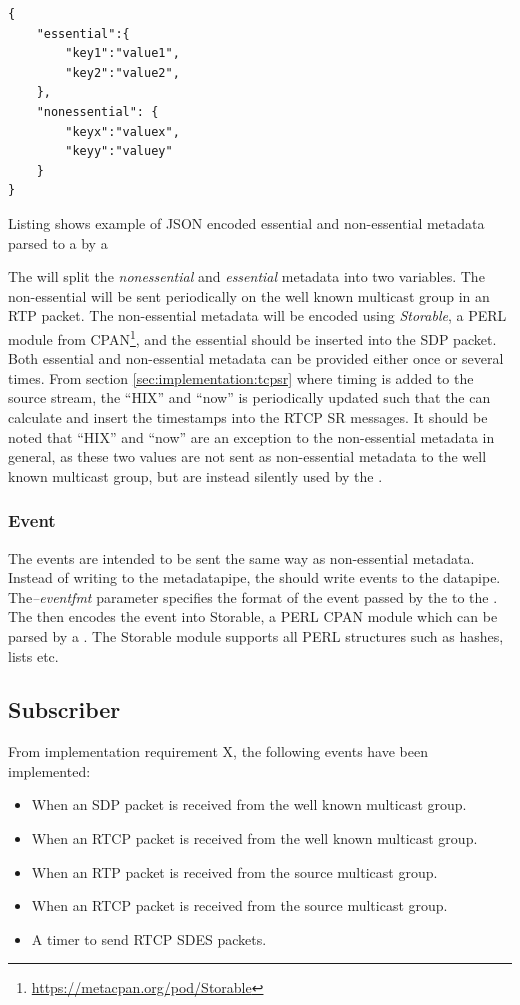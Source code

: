 \begin{listing}[H] 
\begin{verbatim}
{
	"essential":{
		"key1":"value1",
		"key2":"value2",
	},
	"nonessential": {
		"keyx":"valuex",
		"keyy":"valuey"
	}
}
\end{verbatim}
\caption{Listing shows example of JSON encoded essential and non-essential metadata parsed to a \pub{} by a \con{}}
\label{lst:implementation:nonessess}
\end{listing}

The \pub{} will split the \textit{nonessential} and \textit{essential} metadata into two variables. The non-essential will be sent periodically on the well known multicast group in an RTP packet.
The non-essential metadata will be encoded using \textit{Storable}, a PERL module from CPAN\footnote{\url{https://metacpan.org/pod/Storable}}, and the essential should be inserted into the SDP packet.
Both essential and non-essential metadata can be provided either once or several times.  From section \ref{sec:implementation:tcpsr} where timing is added to the source stream, the ``HIX'' and ``now'' is periodically updated such that the \pub{} can calculate and insert the timestamps into the RTCP SR messages.
It should be noted that ``HIX'' and ``now'' are an exception to the non-essential metadata in general, as these two values are not sent as non-essential metadata to the well known multicast group, but are instead silently used by the \pub{}.

\subsubsection{Event} \label{sec:implementation:events:pub}
The events are intended to be sent the same way as non-essential metadata. Instead of writing to the metadatapipe, the \pro{} should write events to the datapipe. The\textit{--eventfmt} parameter specifies the format of the event passed by the \pro{} to the \pub{}. The \pub{} then encodes the event into Storable, a PERL CPAN module which can be parsed by a \sub{}. The Storable module supports all PERL structures such as hashes, lists etc.


\subsection{Subscriber}
From implementation requirement X, the following events have been implemented:
\begin{itemize}
	\item When an SDP packet is received from the well known multicast group.
	\item When an RTCP packet is received from the well known multicast group.
	\item When an RTP packet is received from the source multicast group.
	\item When an RTCP packet is received from the source multicast group.
	\item A timer to send RTCP SDES packets.
\end{itemize}


